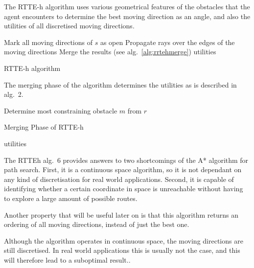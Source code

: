 
			The RTTE-h algorithm uses various geometrical features of the obstacles that the agent encounters to determine the best moving direction as an angle, and also the utilities of all discretised moving directions.

			\begin{algorithm}[h!]
				Mark all moving directions of $s$ as open\;
				Propagate rays over the edges of the moving directions\;
				Merge the results (see alg.~\ref{alg:rrtehmerge})\;
				\Return utilities\;
				\label{alg:rtteh}
				\caption{RTTE-h algorithm~\protect\cite{undeger2010multi}}
			\end{algorithm}

			The merging phase of the algorithm determines the utilities as is described in alg.~2.


			\begin{algorithm}[h!]
				Determine most constraining obstacle $m$ from $r$\;
				\label{alg:rrtehmerge}
				\caption{Merging Phase of RTTE-h~\protect\cite{undeger2010multi}}
				\Return utilities\;
			\end{algorithm}

			The RTTEh alg.~6 provides answers to two shortcomings of the A* algorithm for path search. First, it is a continuous space algorithm, so it is not dependant on any kind of discretisation for real world applications. Second, it is capable of identifying whether a certain coordinate in space is unreachable without having to explore a large amount of possible routes.

			Another property that will be useful later on is that this algorithm returns an ordering of all moving directions, instead of just the best one.

			Although the algorithm operates in continuous space, the moving directions are still discretised. In real world applications this is usually not the case, and this will therefore lead to a suboptimal result.\cite{undeger2009real, undeger2010multi, undeger2007single}.